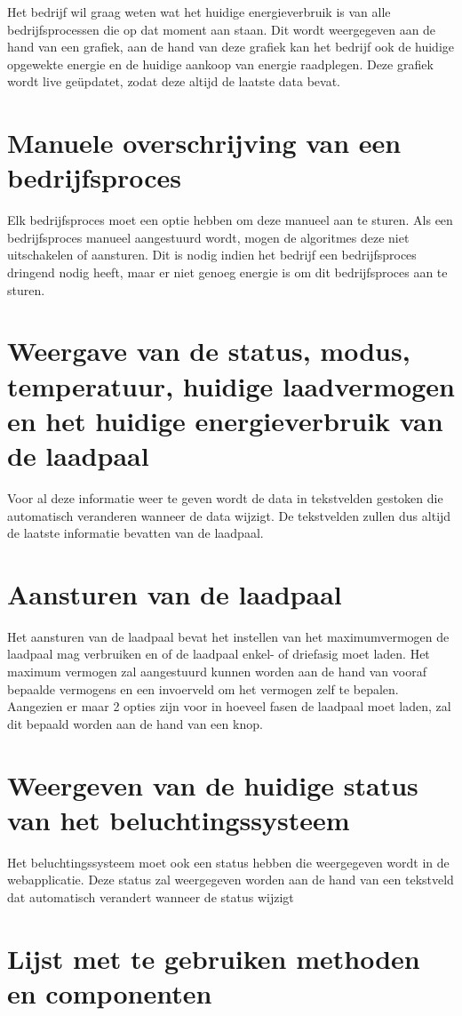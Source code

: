 Het bedrijf wil graag weten wat het huidige energieverbruik is van alle bedrijfsprocessen die op dat moment aan staan. Dit wordt weergegeven aan de hand van een grafiek, aan de hand van deze grafiek kan het bedrijf ook de huidige opgewekte energie en de huidige aankoop van energie raadplegen. Deze grafiek wordt live geüpdatet, zodat deze altijd de laatste data bevat.

\section{Manuele overschrijving van een bedrijfsproces}
\label{sec:manuele-overschrijving-van-een-bedrijfsproces}

Elk bedrijfsproces moet een optie hebben om deze manueel aan te sturen. Als een bedrijfsproces manueel aangestuurd wordt, mogen de algoritmes deze niet uitschakelen of aansturen. Dit is nodig indien het bedrijf een bedrijfsproces dringend nodig heeft, maar er niet genoeg energie is om dit bedrijfsproces aan te sturen.

\section{Weergave van de status, modus, temperatuur, huidige laadvermogen en het huidige energieverbruik van de laadpaal}
\label{sec:weergave-van-de-status-van-de-laadpaal}

Voor al deze informatie weer te geven wordt de data in tekstvelden gestoken die automatisch veranderen wanneer de data wijzigt. De tekstvelden zullen dus altijd de laatste informatie bevatten van de laadpaal.

\section{Aansturen van de laadpaal}
\label{sec:aansturen-van-de-laadpaal}

Het aansturen van de laadpaal bevat het instellen van het maximumvermogen de laadpaal mag verbruiken en of de laadpaal enkel- of driefasig moet laden. Het maximum vermogen zal aangestuurd kunnen worden aan de hand van vooraf bepaalde vermogens en een invoerveld om het vermogen zelf te bepalen. Aangezien er maar 2 opties zijn voor in hoeveel fasen de laadpaal moet laden, zal dit bepaald worden aan de hand van een knop.

\section{Weergeven van de huidige status van het beluchtingssysteem}
\label{sec:weergeven-van-de-huidige-status-van-het-beluchtingssysteem}

Het beluchtingssysteem moet ook een status hebben die weergegeven wordt in de webapplicatie. Deze status zal weergegeven worden aan de hand van een tekstveld dat automatisch verandert wanneer de status wijzigt

\section{Lijst met te gebruiken methoden en componenten}
\label{sec:lijst-met-te-gebruiken-methoden-en-componenten}
